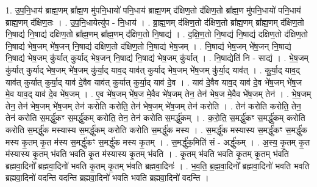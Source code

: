 \documentclass[17pt]{extarticle}
\begin{document}
1. उ॒प॒नि॒धाय॑ ब्राह्म॒णम् ब्रा᳚ह्म॒ण मु॑पनि॒धायो॑ पनि॒धाय॑ ब्राह्म॒णम् द॑क्षिण॒तो द॑क्षिण॒तो ब्रा᳚ह्म॒ण मु॑पनि॒धायो॑ पनि॒धाय॑ ब्राह्म॒णम् द॑क्षिण॒तः । . उ॒प॒नि॒धायेत्यु॑प - नि॒धाय॑ । . ब्रा॒ह्म॒णम् द॑क्षिण॒तो द॑क्षिण॒तो ब्रा᳚ह्म॒णम् ब्रा᳚ह्म॒णम् द॑क्षिण॒तो नि॒षाद्य॑ नि॒षाद्य॑ दक्षिण॒तो ब्रा᳚ह्म॒णम् ब्रा᳚ह्म॒णम् द॑क्षिण॒तो नि॒षाद्य॑ । . द॒क्षि॒ण॒तो नि॒षाद्य॑ नि॒षाद्य॑ दक्षिण॒तो द॑क्षिण॒तो नि॒षाद्य॑ भेष॒जम् भे॑ष॒जन् नि॒षाद्य॑ दक्षिण॒तो द॑क्षिण॒तो नि॒षाद्य॑ भेष॒जम् । . नि॒षाद्य॑ भेष॒जम् भे॑ष॒जन् नि॒षाद्य॑ नि॒षाद्य॑ भेष॒जम् कु॑र्यात् कुर्याद् भेष॒जन् नि॒षाद्य॑ नि॒षाद्य॑ भेष॒जम् कु॑र्यात् । . नि॒षाद्येति॑ नि - साद्य॑ । . भे॒ष॒जम् कु॑र्यात् कुर्याद् भेष॒जम् भे॑ष॒जम् कु॑र्या॒द् याव॒द् याव॑त् कुर्याद् भेष॒जम् भे॑ष॒जम् कु॑र्या॒द् याव॑त् । . कु॒र्या॒द् याव॒द् याव॑त् कुर्यात् कुर्या॒द् याव॑ दे॒वैव याव॑त् कुर्यात् कुर्या॒द् याव॑ दे॒व । . याव॑ दे॒वैव याव॒द् याव॑ दे॒व भे॑ष॒जम् भे॑ष॒ज मे॒व याव॒द् याव॑ दे॒व भे॑ष॒जम् । . ए॒व भे॑ष॒जम् भे॑ष॒ज मे॒वैव भे॑ष॒जम् तेन॒ तेन॑ भेष॒ज मे॒वैव भे॑ष॒जम् तेन॑ । . भे॒ष॒जम् तेन॒ तेन॑ भेष॒जम् भे॑ष॒जम् तेन॑ करोति करोति॒ तेन॑ भेष॒जम् भे॑ष॒जम् तेन॑ करोति । . तेन॑ करोति करोति॒ तेन॒ तेन॑ करोति स॒मर्द्धु॑कꣳ स॒मर्द्धु॑कम् करोति॒ तेन॒ तेन॑ करोति स॒मर्द्धु॑कम् । . क॒रो॒ति॒ स॒मर्द्धु॑कꣳ स॒मर्द्धु॑कम् करोति करोति स॒मर्द्धु॑क मस्यास्य स॒मर्द्धु॑कम् करोति करोति स॒मर्द्धु॑क मस्य । . स॒मर्द्धु॑क मस्यास्य स॒मर्द्धु॑कꣳ स॒मर्द्धु॑क मस्य कृ॒तम् कृ॒त म॑स्य स॒मर्द्धु॑कꣳ स॒मर्द्धु॑क मस्य कृ॒तम् । . स॒मर्द्धु॑क॒मिति॑ सं - अर्द्धु॑कम् । . अ॒स्य॒ कृ॒तम् कृ॒त म॑स्यास्य कृ॒तम् भ॑वति भवति कृ॒त म॑स्यास्य कृ॒तम् भ॑वति । . कृ॒तम् भ॑वति भवति कृ॒तम् कृ॒तम् भ॑वति ब्रह्मवा॒दिनो᳚ ब्रह्मवा॒दिनो॑ भवति कृ॒तम् कृ॒तम् भ॑वति ब्रह्मवा॒दिनः॑ । . भ॒व॒ति॒ ब्र॒ह्म॒वा॒दिनो᳚ ब्रह्मवा॒दिनो॑ भवति भवति ब्रह्मवा॒दिनो॑ वदन्ति वदन्ति ब्रह्मवा॒दिनो॑ भवति भवति ब्रह्मवा॒दिनो॑ वदन्ति । \newline
\end{document}
